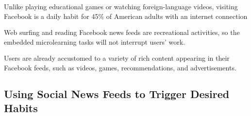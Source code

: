 \documentclass{sigchi}
\begin{document}
\begin{compactitem}
\item Unlike playing educational games or watching foreign-language videos, visiting Facebook is a daily habit for 45\% of American adults with an internet connection \cite{socialmediaupdate} %
\item Web surfing and reading Facebook news feeds are recreational activities, so the embedded microlearning tasks will not interrupt users' work.
\item Users are already accustomed to a variety of rich content appearing in their Facebook feeds, such as videos, games, recommendations, and advertisements.
\end{compactitem}




\subsection{Using Social News Feeds to Trigger Desired Habits}
\end{document}
